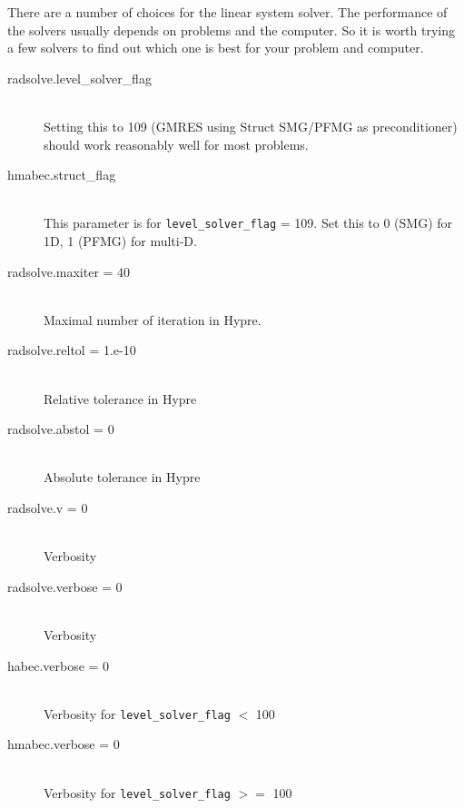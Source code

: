 \documentclass[11pt,letterpaper]{article}
\begin{document}
There are a number of choices for the linear system solver.  The
performance of the solvers usually depends on problems and the
computer.  So it is worth trying a few solvers to find out which one
is best for your problem and computer.

\begin{description}
\item[radsolve.level\_solver\_flag] \hfill \\
  Setting this to 109 (GMRES using Struct SMG/PFMG as preconditioner)
  should work reasonably well for most problems. 
\item[hmabec.struct\_flag] \hfill \\
  This parameter is for {\tt level\_solver\_flag} = 109. Set this to 0
  (SMG) for 1D, 1 (PFMG) for multi-D.
\item[radsolve.maxiter = 40] \hfill \\
  Maximal number of iteration in Hypre.
\item[radsolve.reltol = 1.e-10] \hfill \\
  Relative tolerance in Hypre
\item[radsolve.abstol = 0] \hfill \\
  Absolute tolerance in Hypre
\item[radsolve.v = 0] \hfill \\
  Verbosity
\item[radsolve.verbose = 0] \hfill \\
  Verbosity
\item[habec.verbose = 0] \hfill \\
  Verbosity for {\tt level\_solver\_flag} $<$ 100
\item[hmabec.verbose = 0] \hfill \\
  Verbosity for {\tt level\_solver\_flag} $>=$ 100
\end{description}
\end{document}
